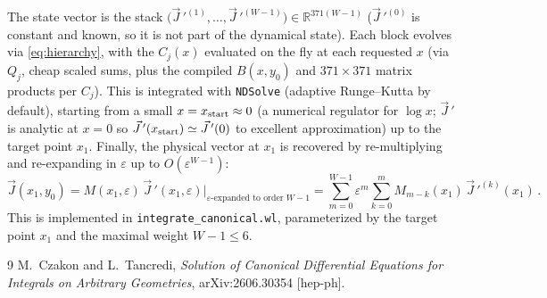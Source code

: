 \documentclass[11pt]{article}
\newcommand{\eps}{\varepsilon}
\newcommand{\Jvec}{\vec J}
\newcommand{\Jreg}{\vec J\,'}
\begin{document}
The state vector is the stack $\big(\Jreg^{(1)},\ldots,\Jreg^{(W-1)}\big)\in\mathbb R^{371(W-1)}$
($\Jreg^{(0)}$ is constant and known, so it is not part of the dynamical state). Each block evolves
via \eqref{eq:hierarchy}, with the $C_j(x)$ evaluated on the fly at each requested $x$ (via
$Q_j$, cheap scaled sums, plus the compiled $B(x,y_0)$ and $371\times371$ matrix products
per $C_j$). This is integrated with \texttt{NDSolve} (adaptive Runge--Kutta by default), starting
from a small $x=x_{\rm start}\approx0$ (a numerical regulator for $\log x$; $\Jreg$ is analytic at
$x=0$ so $\Jreg(x_{\rm start})\simeq\Jreg(0)$ to excellent approximation) up to the target point
$x_1$. Finally, the physical vector at $x_1$ is recovered by re-multiplying and
re-expanding in $\eps$ up to $O(\eps^{W-1})$:
\begin{equation}
\Jvec(x_1,y_0) = M(x_1,\eps)\,\Jreg(x_1,\eps)\Big|_{\eps\text{-expanded to order }W-1}
= \sum_{m=0}^{W-1}\eps^m \sum_{k=0}^m M_{m-k}(x_1)\,\Jreg^{(k)}(x_1)\,.
\end{equation}
This is implemented in \texttt{integrate\_canonical.wl}, parameterized by the target point $x_1$ and
the maximal weight $W-1\le6$.

\begin{thebibliography}{9}
 M.~Czakon and L.~Tancredi,
\emph{Solution of Canonical Differential Equations for Integrals on Arbitrary Geometries},
arXiv:2606.30354 [hep-ph].
\end{thebibliography}
\end{document}
